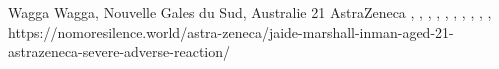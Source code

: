           {Wagga Wagga, Nouvelle Gales du Sud, Australie}
          {21}
          {AstraZeneca}
          {}
          {
            ,
            ,
            ,
            ,
            ,
            ,
            ,
            ,
            ,
            ,
          }
          {https://nomoresilence.world/astra-zeneca/jaide-marshall-inman-aged-21-astrazeneca-severe-adverse-reaction/}


